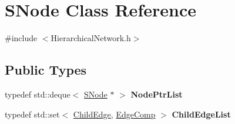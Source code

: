 \hypertarget{classSNode}{}\section{S\+Node Class Reference}
\label{classSNode}


{\ttfamily \#include $<$Hierarchical\+Network.\+h$>$}

\subsection*{Public Types}
\begin{DoxyCompactItemize}
\item 
\mbox{\label{classSNode_a9179da0fbb1e35004036d12eeddb75ee}} 
typedef std\+::deque$<$ \mbox{\hyperlink{classSNode}{S\+Node}} $\ast$ $>$ {\bfseries Node\+Ptr\+List}
\item 
\mbox{\label{classSNode_ab7ff1cd050c3ed286ced663b078a0fac}} 
typedef std\+::set$<$ \mbox{\hyperlink{structChildEdge}{Child\+Edge}}, \mbox{\hyperlink{structEdgeComp}{Edge\+Comp}} $>$ {\bfseries Child\+Edge\+List}
\end{DoxyCompactItemize}
